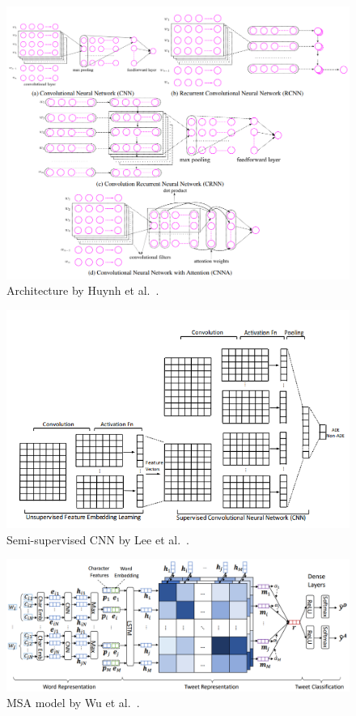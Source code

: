\begin{figure}[h]
	\centering
	\includegraphics[width=0.99\linewidth]{Figures/e.png}
	\caption{Architecture by Huynh et al.~\cite{huynh2016adverse}.}
	\label{fig:architecture-huynh}
\end{figure}

\begin{figure}[h]
	\centering
	\includegraphics[width=0.99\linewidth]{Figures/l.png}
	\caption{Semi-supervised CNN by Lee et al.~\cite{lee2017adverse}.}
	\label{fig:architecture-lee}
\end{figure}

\begin{figure}[h]
	\centering
	\includegraphics[width=0.99\linewidth]{Figures/k.png}
	\caption{MSA model by Wu et al.~\cite{wu2019msa}.}
	\label{fig:architecture-wu-msa} 
\end{figure}

